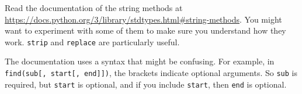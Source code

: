 \begin{ex}

Read the documentation of the string methods at
\url{https://docs.python.org/3/library/stdtypes.html#string-methods}.
You might want to experiment with some of them to make sure
you understand how they work.  {\tt strip} and
{\tt replace} are particularly useful.

The documentation uses a syntax that might be confusing.
For example, in \verb"find(sub[, start[, end]])", the brackets
indicate optional arguments.  So {\tt sub} is required, but
{\tt start} is optional, and if you include {\tt start},
then {\tt end} is optional.
\end{ex}